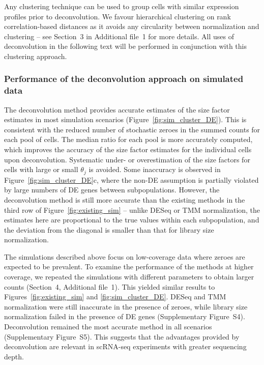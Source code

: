 \documentclass{bmcart}
\newcommand{\suppclustering}{3}
\newcommand{\supphighcov}{4}
\newcommand{\supphighcovex}{S4}
\newcommand{\supphighcovde}{S5}
\newcommand{\revised}[1]{#1}
\begin{document}
Any clustering technique can be used to group cells with similar expression profiles prior to deconvolution.
We favour hierarchical clustering on rank correlation-based distances as it avoids any circularity between normalization and clustering
    -- see Section~\suppclustering{} in Additional file~1 for more details.
All uses of deconvolution in the following text will be performed in conjunction with this clustering approach.

\subsubsection*{Performance of the deconvolution approach on simulated data}
The deconvolution method provides accurate estimates of the size factor estimates in most simulation scenarios (Figure~\ref{fig:sim_cluster_DE}).
This is consistent with the reduced number of stochastic zeroes in the summed counts for each \revised{pool} of cells.
The median ratio for each \revised{pool} is more accurately computed, which improves the accuracy of the size factor estimates for the individual cells upon deconvolution.
Systematic under- or overestimation of the size factors for cells with large or small $\theta_j$ is avoided.
Some inaccuracy is observed in Figure~\ref{fig:sim_cluster_DE}c, where the non-DE assumption is partially violated by large numbers of DE genes between subpopulations.
However, the deconvolution method is still more accurate than the existing methods in the third row of Figure~\ref{fig:existing_sim}
    -- unlike DESeq or TMM normalization, the estimates here are proportional to the true values within each subpopulation, 
       and the deviation from the diagonal is smaller than that for library size normalization.

\revised{The simulations described above focus on low-coverage data where zeroes are expected to be prevalent.
To examine the performance of the methods at higher coverage, we repeated the simulations with different parameters to obtain larger counts (Section~\supphighcov{}, Additional file~1).
This yielded similar results to Figures~\ref{fig:existing_sim} and \ref{fig:sim_cluster_DE}.
DESeq and TMM normalization were still inaccurate in the presence of zeroes, while library size normalization failed in the presence of DE genes (Supplementary Figure~\supphighcovex{}). 
Deconvolution remained the most accurate method in all scenarios (Supplementary Figure~\supphighcovde{}).
This suggests that the advantages provided by deconvolution are relevant in scRNA-seq experiments with greater sequencing depth.}
\end{document}
